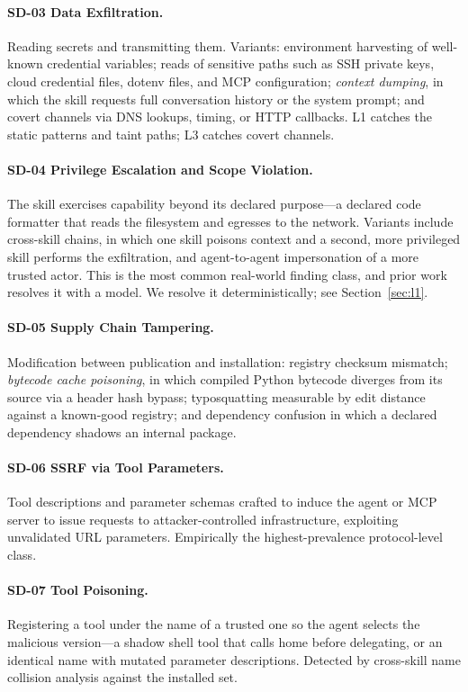 \documentclass[11pt]{article}
\begin{document}
\paragraph{SD-03 \textbullet{} Data Exfiltration.} Reading secrets and
transmitting them. Variants: environment harvesting of well-known credential
variables; reads of sensitive paths such as SSH private keys, cloud credential
files, dotenv files, and MCP configuration; \emph{context dumping}, in which
the skill requests full conversation history or the system prompt; and covert
channels via DNS lookups, timing, or HTTP callbacks. L1 catches the static
patterns and taint paths; L3 catches covert channels.

\paragraph{SD-04 \textbullet{} Privilege Escalation and Scope Violation.} The
skill exercises capability beyond its declared purpose---a declared code
formatter that reads the filesystem and egresses to the network. Variants
include cross-skill chains, in which one skill poisons context and a second,
more privileged skill performs the exfiltration, and agent-to-agent
impersonation of a more trusted actor. This is the most common real-world
finding class, and prior work resolves it with a model. We resolve it
deterministically; see Section~\ref{sec:l1}.

\paragraph{SD-05 \textbullet{} Supply Chain Tampering.} Modification between
publication and installation: registry checksum mismatch; \emph{bytecode cache
poisoning}, in which compiled Python bytecode diverges from its source via a
header hash bypass; typosquatting measurable by edit distance against a
known-good registry; and dependency confusion in which a declared dependency
shadows an internal package.

\paragraph{SD-06 \textbullet{} SSRF via Tool Parameters.} Tool descriptions and
parameter schemas crafted to induce the agent or MCP server to issue requests
to attacker-controlled infrastructure, exploiting unvalidated URL parameters.
Empirically the highest-prevalence protocol-level class.

\paragraph{SD-07 \textbullet{} Tool Poisoning.} Registering a tool under the
name of a trusted one so the agent selects the malicious version---a shadow
shell tool that calls home before delegating, or an identical name with mutated
parameter descriptions. Detected by cross-skill name collision analysis against
the installed set.
\end{document}
